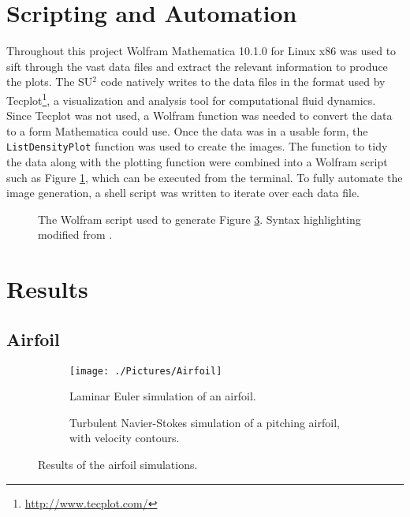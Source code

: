 \documentclass[10pt, titlepage]{article}
\begin{document}
\section{Scripting and Automation}

Throughout this project Wolfram Mathematica 10.1.0 for Linux x86 was used to sift through the vast data files and extract the relevant information to produce the plots. The SU$^2$ code natively writes to the data files in the format used by Tecplot\footnote{\url{http://www.tecplot.com/}}, a visualization and analysis tool for computational fluid dynamics. Since Tecplot was not used, a Wolfram function was needed to convert the data to a form Mathematica could use. Once the data was in a usable form, the \texttt{ListDensityPlot} function was used to create the images. The function to tidy the data along with the plotting function were combined into a Wolfram script such as Figure \ref{fig:script}, which can be executed from the terminal. To fully automate the image generation, a shell script was written to iterate over each data file.

\begin{figure}[p]

\caption[Automated Wolfram Script]{The Wolfram script used to generate Figure \ref{fig:airfoilanimation}. Syntax highlighting modified from \cite{syntax}.}
\label{fig:script}
\end{figure}

\newpage
\section{Results}

\subsection{Airfoil}

\begin{figure}[htbp]
\begin{subfigure}[t]{0.5\linewidth}
\centering
\texttt{[image: ./Pictures/Airfoil]}
\caption{Laminar Euler simulation of an airfoil.}
\label{fig:staticairfoil}
\end{subfigure}
\begin{subfigure}[t]{0.5\textwidth}
\centering
{}
\caption{Turbulent Navier-Stokes simulation of a pitching airfoil, with velocity contours.}
\label{fig:airfoilanimation}
\end{subfigure}
\caption[Turbulent Airfoil Animation, and Laminar Airfoil Streamlines]{Results of the airfoil simulations.}
\label{fig:airfoil}
\end{figure}
\end{document}
